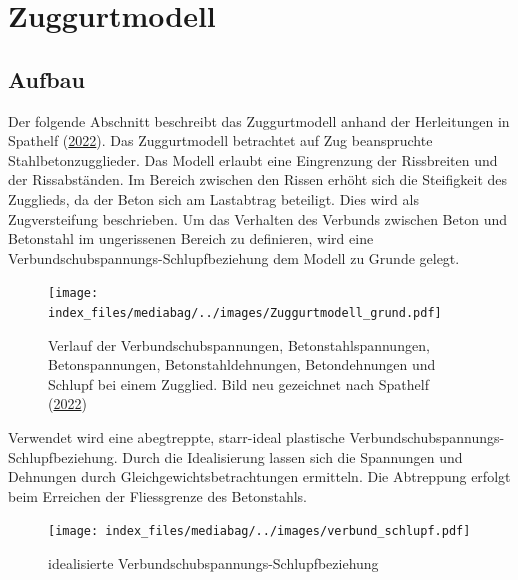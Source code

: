 \documentclass[
  letterpaper,
]{scrreprt}
\begin{document}
\hypertarget{zuggurtmodell}{%
\section{Zuggurtmodell}\label{zuggurtmodell}}

\hypertarget{aufbau-2}{%
\subsection{Aufbau}\label{aufbau-2}}

Der folgende Abschnitt beschreibt das Zuggurtmodell anhand der
Herleitungen in Spathelf (\protect\hyperlink{ref-Spathelf2022}{2022}).
Das Zuggurtmodell betrachtet auf Zug beanspruchte Stahlbetonzugglieder.
Das Modell erlaubt eine Eingrenzung der Rissbreiten und der
Rissabständen. Im Bereich zwischen den Rissen erhöht sich die
Steifigkeit des Zugglieds, da der Beton sich am Lastabtrag beteiligt.
Dies wird als Zugversteifung beschrieben. Um das Verhalten des Verbunds
zwischen Beton und Betonstahl im ungerissenen Bereich zu definieren,
wird eine Verbundschubspannungs-Schlupfbeziehung dem Modell zu Grunde
gelegt.

\begin{figure}[H]

{\centering \texttt{[image: index\_files/mediabag/../images/Zuggurtmodell\_grund.pdf]}

}

\caption{\label{fig-zuggurtmodell}Verlauf der Verbundschubspannungen,
Betonstahlspannungen, Betonspannungen, Betonstahldehnungen,
Betondehnungen und Schlupf bei einem Zugglied. Bild neu gezeichnet nach
Spathelf (\protect\hyperlink{ref-Spathelf2022}{2022})}

\end{figure}

Verwendet wird eine abegtreppte, starr-ideal plastische
Verbundschubspannungs-Schlupfbeziehung. Durch die Idealisierung lassen
sich die Spannungen und Dehnungen durch Gleichgewichtsbetrachtungen
ermitteln. Die Abtreppung erfolgt beim Erreichen der Fliessgrenze des
Betonstahls.

\begin{figure}[H]

{\centering \texttt{[image: index\_files/mediabag/../images/verbund\_schlupf.pdf]}

}

\caption{\label{fig-verbund_schlupf}idealisierte
Verbundschubspannungs-Schlupfbeziehung}

\end{figure}
\end{document}
